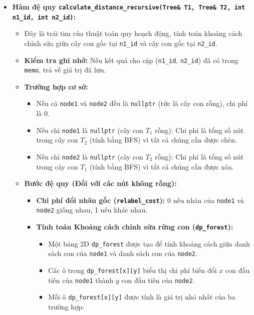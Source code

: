 \documentclass{article}
\begin{document}
\begin{itemize}
    \item \textbf{Hàm đệ quy \texttt{calculate\_distance\_recursive(Tree\& T1, Tree\& T2, int n1\_id, int n2\_id)}:}
    \begin{itemize}
        \item Đây là trái tim của thuật toán quy hoạch động, tính toán khoảng cách chỉnh sửa giữa cây con gốc tại \texttt{n1\_id} và cây con gốc tại \texttt{n2\_id}.
        \item \textbf{Kiểm tra ghi nhớ:} Nếu kết quả cho cặp (\texttt{n1\_id}, \texttt{n2\_id}) đã có trong \texttt{memo}, trả về giá trị đã lưu.
        \item \textbf{Trường hợp cơ sở:}
            \begin{itemize}
                \item Nếu cả \texttt{node1} và \texttt{node2} đều là \texttt{nullptr} (tức là cây con rỗng), chi phí là 0.
                \item Nếu chỉ \texttt{node1} là \texttt{nullptr} (cây con $T_1$ rỗng): Chi phí là tổng số nút trong cây con $T_2$ (tính bằng BFS) vì tất cả chúng cần được chèn.
                \item Nếu chỉ \texttt{node2} là \texttt{nullptr} (cây con $T_2$ rỗng): Chi phí là tổng số nút trong cây con $T_1$ (tính bằng BFS) vì tất cả chúng cần được xóa.
            \end{itemize}
        \item \textbf{Bước đệ quy (Đối với các nút không rỗng):}
            \begin{itemize}
                \item \textbf{Chi phí đổi nhãn gốc (\texttt{relabel\_cost}):} 0 nếu nhãn của \texttt{node1} và \texttt{node2} giống nhau, 1 nếu khác nhau.
                \item \textbf{Tính toán Khoảng cách chỉnh sửa rừng con (\texttt{dp\_forest}):}
                    \begin{itemize}
                        \item Một bảng 2D \texttt{dp\_forest} được tạo để tính khoảng cách giữa danh sách con của \texttt{node1} và danh sách con của \texttt{node2}.
                        \item Các ô trong \texttt{dp\_forest[x][y]} biểu thị chi phí biến đổi $x$ con đầu tiên của \texttt{node1} thành $y$ con đầu tiên của \texttt{node2}.
                        \item Mỗi ô \texttt{dp\_forest[x][y]} được tính là giá trị nhỏ nhất của ba trường hợp:
                            \begin{enumerate}

\end{enumerate}
\end{itemize}
\end{itemize}
\end{itemize}
\end{itemize}
\end{document}
